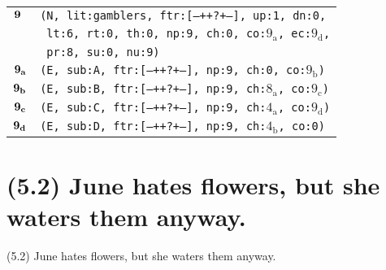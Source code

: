 \documentclass{article}
\begin{document}
\begin{minipage}{\textwidth}
{\begin{tabular}{|r|l|}
    ${\textbf{\textrm{9}}_{\phantom{z}}}$ & \texttt{\texttt{(N,~lit:gamblers,~ftr:[---++?+--],~up:1,~dn:0,}} \\
    & \texttt{\texttt{~lt:6,~rt:0,~th:0,~np:9,~ch:0,~co:${\textrm{9}_{\textrm{a}}}$,~ec:${\textrm{9}_{\textrm{d}}}$,}} \\
    & \texttt{\texttt{~pr:8,~su:0,~nu:9)}} \\
    ${\textbf{\textrm{9}}_{\textbf{\textrm{a}}}}$ & \texttt{\texttt{(E,~sub:A,~ftr:[---++?+--],~np:9,~ch:0,~co:${\textrm{9}_{\textrm{b}}}$)}} \\
    ${\textbf{\textrm{9}}_{\textbf{\textrm{b}}}}$ & \texttt{\texttt{(E,~sub:B,~ftr:[---++?+--],~np:9,~ch:${\textrm{8}_{\textrm{a}}}$,~co:${\textrm{9}_{\textrm{c}}}$)}} \\
    ${\textbf{\textrm{9}}_{\textbf{\textrm{c}}}}$ & \texttt{\texttt{(E,~sub:C,~ftr:[---++?+--],~np:9,~ch:${\textrm{4}_{\textrm{a}}}$,~co:${\textrm{9}_{\textrm{d}}}$)}} \\
    ${\textbf{\textrm{9}}_{\textbf{\textrm{d}}}}$ & \texttt{\texttt{(E,~sub:D,~ftr:[---++?+--],~np:9,~ch:${\textrm{4}_{\textrm{b}}}$,~co:0)}} \\
    \hline
  \end{tabular}
  }
\end{minipage}
\bigbreak

\clearpage

%
%

\section*{(5.2) June hates flowers, but she waters them anyway.}

\bigbreak
\begin{enumerate*}
\item[(5.2)] June hates flowers, but she waters them anyway.
\end{enumerate*}
\bigbreak
\end{document}
